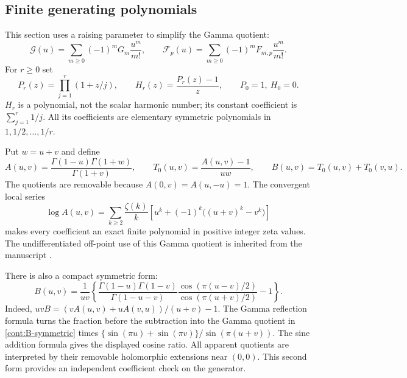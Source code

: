 \subsection{Finite generating polynomials}

This section uses a raising parameter to simplify the Gamma quotient:
\[
 \mathcal G(u)=\sum_{m\ge0}(-1)^mG_m\frac{u^m}{m!},
 \qquad \mathcal F_p(u)=\sum_{m\ge0}(-1)^mF_{m,p}\frac{u^m}{m!}.
\]
For $r\ge0$ set
\begin{equation}\label{cont:P-H}
 P_r(z)=\prod_{j=1}^r(1+z/j),\qquad
 H_r(z)=\frac{P_r(z)-1}{z},\qquad P_0=1,\ H_0=0.
\end{equation}
$H_r$ is a polynomial, not the scalar harmonic number; its constant
coefficient is $\sum_{j=1}^r1/j$.  All its coefficients are elementary
symmetric polynomials in $1,1/2,\ldots,1/r$.

Put $w=u+v$ and define
\begin{equation}\label{cont:A-B}
 A(u,v)=\frac{\Gamma(1-u)\Gamma(1+w)}{\Gamma(1+v)},
 \qquad T_0(u,v)=\frac{A(u,v)-1}{uw},
 \qquad B(u,v)=T_0(u,v)+T_0(v,u).
\end{equation}
The quotients are removable because $A(0,v)=A(u,-u)=1$.
The convergent local series
\begin{equation}\label{cont:log-A}
 \log A(u,v)=\sum_{k\ge2}\frac{\zeta(k)}{k}
       \left[u^k+(-1)^k\big((u+v)^k-v^k\big)\right]
\end{equation}
makes every coefficient an exact finite polynomial in positive
integer zeta values.  The undifferentiated off-point use of this
Gamma quotient is inherited from the manuscript \cite{Repo}.

There is also a compact symmetric form:
\begin{equation}\label{cont:B-symmetric}
 B(u,v)=\frac1{uv}\left\{
  \frac{\Gamma(1-u)\Gamma(1-v)}{\Gamma(1-u-v)}
  \frac{\cos(\pi(u-v)/2)}{\cos(\pi(u+v)/2)}-1\right\}.
\end{equation}
Indeed,
$uvB=(vA(u,v)+uA(v,u))/(u+v)-1$.
The Gamma reflection formula turns the fraction before the subtraction
into the Gamma quotient in \eqref{cont:B-symmetric} times
$\{\sin(\pi u)+\sin(\pi v)\}/\sin(\pi(u+v))$.
The sine addition formula gives the displayed cosine ratio. All
apparent quotients are interpreted by their removable holomorphic
extensions near $(0,0)$. This second form provides an independent
coefficient check on the generator.

